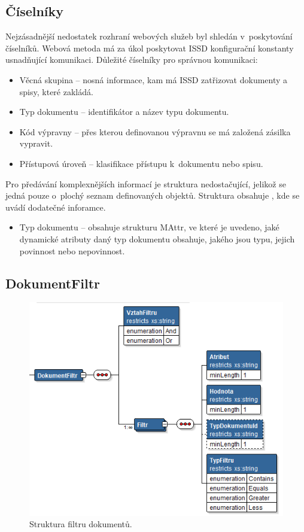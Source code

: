\documentclass[
  master,
  field=ainfp,
  biblatex,
  language=czech,
  glossaries,
  theorems=false,
  index
]{kidiplom}
\begin{document}
\subsection{Číselníky}
Nejzásadnější nedostatek rozhraní webových služeb byl shledán v~poskytování číselníků. Webová metoda  má za úkol poskytovat ISSD konfigurační konstanty usnadňující komunikaci.
Důležité číselníky pro správnou komunikaci:
\begin{itemize}
	\item Věcná skupina -- nosná informace, kam má ISSD zatřizovat dokumenty a spisy, které zakládá.
	\item Typ dokumentu -- identifikátor a název typu dokumentu.
	\item Kód výpravny -- přes kterou definovanou výpravnu se má založená zásilka vypravit.
	\item Přístupová úroveň -- klasifikace přístupu k~dokumentu nebo spisu.
\end{itemize}

Pro předávání komplexnějších informací je struktura nedostačující, jelikož se jedná pouze o~plochý seznam definovaných objektů. Struktura  obsahuje , kde se uvádí dodatečné inforamce.
\begin{itemize}
	\item Typ dokumentu -- obsahuje strukturu MAttr, ve které je uvedeno, jaké dynamické atributy daný typ dokumentu obsahuje, jakého jsou typu, jejich povinnost nebo nepovinnost.
\end{itemize}


\subsection{DokumentFiltr}
\begin{figure}[h]
  \centerline{\includegraphics[width=0.6\linewidth]{./images/DokumentFiltr.png}} 
  \caption{Struktura filtru dokumentů.} 
\end{figure}
\end{document}
